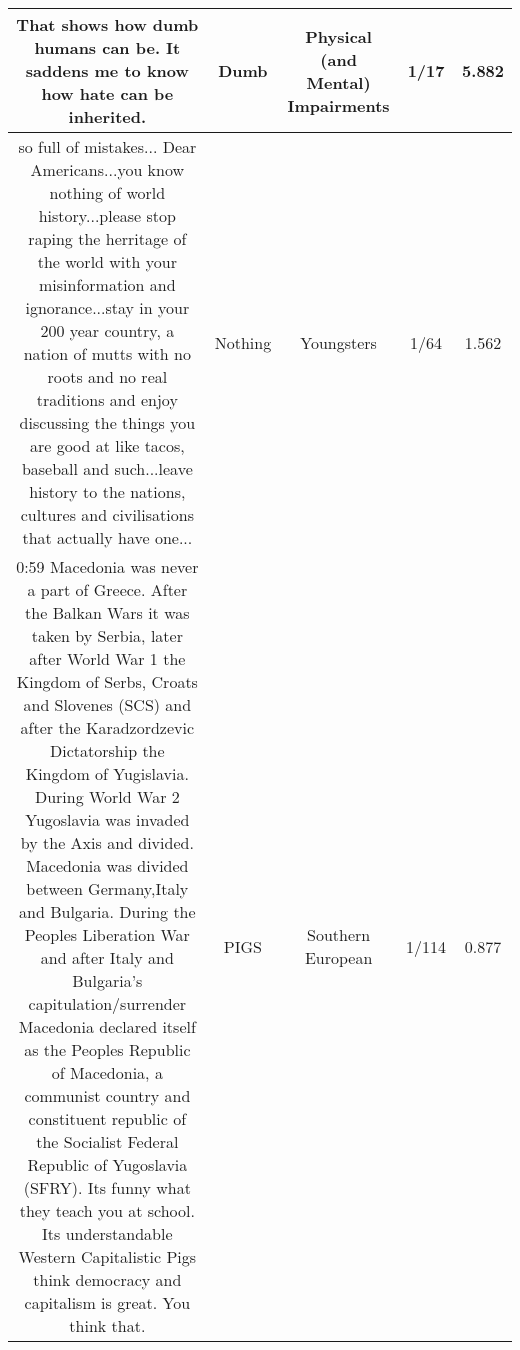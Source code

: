 \documentclass[11pt]{article}
\newlength\mylength
\begin{document}
\begin{center}
\begin{longtable}{|C{.40\mylength}|C{.30\mylength}|C{.15\mylength}|C{.15\mylength}|C{.15\mylength}|}
  That shows how dumb humans can be. It saddens me to know how hate can be inherited.  & Dumb & Physical (and Mental) Impairments & 1/17 & 5.882 \\  \hline
  so full of mistakes... Dear Americans...you know nothing of world history...please stop raping the herritage of the world with your misinformation and ignorance...stay in your 200  year country, a nation of mutts with no roots and no real traditions and enjoy discussing the things you are good at like tacos, baseball and such...leave history to the nations, cultures and civilisations that actually have one...  & Nothing & Youngsters & 1/64 & 1.562 \\  \hline
  0:59 Macedonia was never a part of Greece. After the Balkan Wars it was taken by Serbia, later after World War 1 the Kingdom of Serbs, Croats and Slovenes (SCS) and after the Karadzordzevic Dictatorship the Kingdom of Yugislavia. During World War 2 Yugoslavia was invaded by the Axis and divided. Macedonia was divided between Germany,Italy and Bulgaria. During the Peoples Liberation War and after Italy and Bulgaria's capitulation/surrender Macedonia declared itself as the Peoples Republic of Macedonia, a communist country and constituent republic of the Socialist Federal Republic of Yugoslavia (SFRY). Its funny what they teach you at school. Its understandable Western Capitalistic Pigs think democracy and capitalism is great. You think that.  & PIGS & Southern European & 1/114 & 0.877 \\  \hline

\end{longtable}
\end{center}
\end{document}
